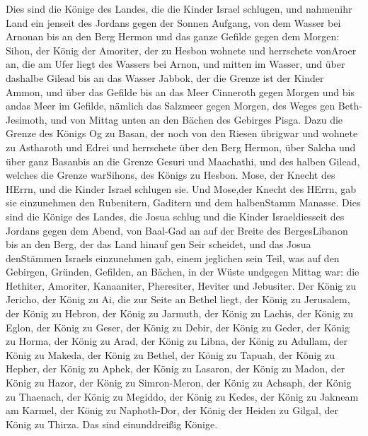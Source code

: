  Dies sind die Könige des Landes, die die Kinder Israel
schlugen, und nahmenihr Land ein jenseit des Jordans gegen der Sonnen
Aufgang, von dem Wasser bei Arnonan bis an den Berg Hermon und das ganze
Gefilde gegen dem Morgen:  Sihon, der König der Amoriter,
der zu Hesbon wohnete und herrschete vonAroer an, die am Ufer liegt des
Wassers bei Arnon, und mitten im Wasser, und über dashalbe Gilead bis an
das Wasser Jabbok, der die Grenze ist der Kinder Ammon,  und
über das Gefilde bis an das Meer Cinneroth gegen Morgen und bis andas
Meer im Gefilde, nämlich das Salzmeer gegen Morgen, des Weges gen
Beth-Jesimoth, und von Mittag unten an den Bächen des Gebirges Pisga.
 Dazu die Grenze des Königs Og zu Basan, der noch von den
Riesen übrigwar und wohnete zu Astharoth und Edrei  und
herrschete über den Berg Hermon, über Salcha und über ganz Basanbis an
die Grenze Gesuri und Maachathi, und des halben Gilead, welches die
Grenze warSihons, des Königs zu Hesbon.  Mose, der Knecht
des HErrn, und die Kinder Israel schlugen sie. Und Mose,der Knecht des
HErrn, gab sie einzunehmen den Rubenitern, Gaditern und dem halbenStamm
Manasse.  Dies sind die Könige des Landes, die Josua schlug
und die Kinder Israeldiesseit des Jordans gegen dem Abend, von Baal-Gad
an auf der Breite des BergesLibanon bis an den Berg, der das Land hinauf
gen Seir scheidet, und das Josua denStämmen Israels einzunehmen gab,
einem jeglichen sein Teil,  was auf den Gebirgen, Gründen,
Gefilden, an Bächen, in der Wüste undgegen Mittag war: die Hethiter,
Amoriter, Kanaaniter, Pheresiter, Heviter und Jebusiter. 
Der König zu Jericho, der König zu Ai, die zur Seite an Bethel liegt,
 der König zu Jerusalem, der König zu Hebron, 
der König zu Jarmuth, der König zu Lachis,  der König zu
Eglon, der König zu Geser,  der König zu Debir, der König
zu Geder,  der König zu Horma, der König zu Arad,
 der König zu Libna, der König zu Adullam, 
der König zu Makeda, der König zu Bethel,  der König zu
Tapuah, der König zu Hepher,  der König zu Aphek, der König
zu Lasaron,  der König zu Madon, der König zu Hazor,
 der König zu Simron-Meron, der König zu Achsaph,
 der König zu Thaenach, der König zu Megiddo, 
der König zu Kedes, der König zu Jakneam am Karmel,  der
König zu Naphoth-Dor, der König der Heiden zu Gilgal,  der
König zu Thirza. Das sind einunddreißig Könige.

